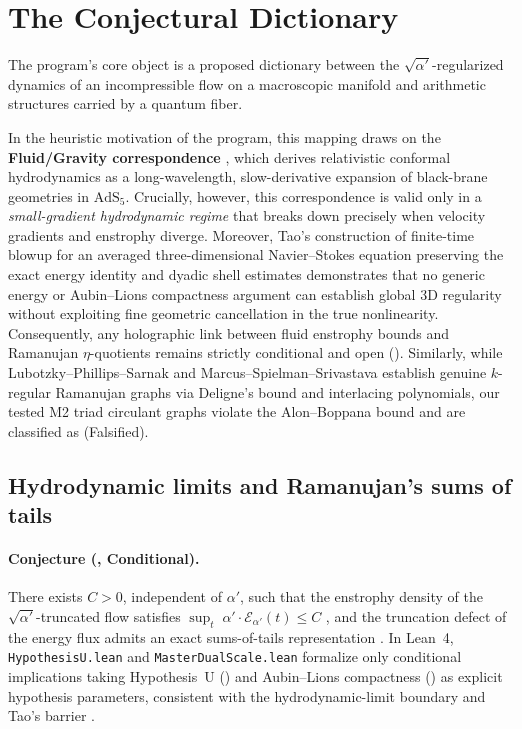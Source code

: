 \section{The Conjectural Dictionary}\label{sec:dictionary}
The program's core object is a proposed dictionary between the $\sqrt{\alpha'}$-regularized dynamics of an incompressible flow on a macroscopic manifold and arithmetic structures carried by a quantum fiber.

In the heuristic motivation of the program, this mapping draws on the \textbf{Fluid/Gravity correspondence} \cite{BHMR2008, Rangamani2009}, which derives relativistic conformal hydrodynamics as a long-wavelength, slow-derivative expansion of black-brane geometries in $\mathrm{AdS}_5$. Crucially, however, this correspondence is valid only in a \emph{small-gradient hydrodynamic regime} that breaks down precisely when velocity gradients and enstrophy diverge. Moreover, Tao's construction of finite-time blowup for an averaged three-dimensional Navier--Stokes equation preserving the exact energy identity and dyadic shell estimates \cite{Tao2016} demonstrates that no generic energy or Aubin--Lions compactness argument can establish global 3D regularity without exploiting fine geometric cancellation in the true nonlinearity. Consequently, any holographic link between fluid enstrophy bounds and Ramanujan $\eta$-quotients remains strictly conditional and open (\tierC{}). Similarly, while Lubotzky--Phillips--Sarnak \cite{LPS1988} and Marcus--Spielman--Srivastava \cite{MSS2015} establish genuine $k$-regular Ramanujan graphs via Deligne's bound \cite{Deligne1974} and interlacing polynomials, our tested M2 triad circulant graphs violate the Alon--Boppana bound and are classified as \tierX{} (Falsified).

\subsection{Hydrodynamic limits and Ramanujan's sums of tails}
\paragraph{Conjecture (\tierC{}, Conditional).}
There exists $C>0$, independent of $\alpha'$, such that the enstrophy
density of the $\sqrt{\alpha'}$-truncated flow satisfies
$\sup_{t}\;\alpha'\!\cdot\!\mathcal{E}_{\alpha'}(t)\le C$ \cite{BKM1984, CKN1982, CF1993, CFM1996}, and the truncation defect of the energy flux
admits an exact sums-of-tails representation \cite{AJO2001, BowmanMcLaughlin2004}. In Lean~4, \texttt{HypothesisU.lean} and \texttt{MasterDualScale.lean} formalize only conditional implications taking Hypothesis~U (\tierC{}) and Aubin--Lions compactness (\tierL{}) as explicit hypothesis parameters, consistent with the hydrodynamic-limit boundary \cite{BHMR2008, Rangamani2009} and Tao's barrier \cite{Tao2016}.

